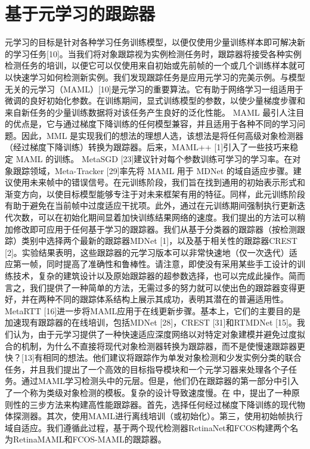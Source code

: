 \section{基于元学习的跟踪器} %
元学习的目标是针对各种学习任务训练模型，以便仅使用少量训练样本即可解决新的学习任务[10]。当我们将对象跟踪视为实例检测任务时，跟踪器将接受各种实例检测任务的培训，以便它可以仅使用来自初始或先前帧的一个或几个训练样本就可以快速学习如何检测新实例。我们发现跟踪任务是应用元学习的完美示例。与模型无关的元学习（MAML）[10]是元学习的重要算法。它有助于网络学习一组适用于微调的良好初始化参数。在训练期间，显式训练模型的参数，以使少量梯度步骤和来自新任务的少量训练数据将对该任务产生良好的泛化性能。 MAML 最引人注目的优点是，它与通过梯度下降训练的任何模型兼容，并且适用于各种不同的学习问题。因此，MML 是实现我们的想法的理想人选，该想法是将任何高级对象检测器（经过梯度下降训练）转换为跟踪器。后来，MAML++ [1]引入了一些技巧来稳定 MAML 的训练。 MetaSGD [23]建议针对每个参数训练可学习的学习率。在对象跟踪领域，Meta-Tracker [29]率先将 MAML 用于 MDNet 的域自适应步骤。建议使用未来帧中的错误信号。在元训练阶段，我们旨在找到通用的初始表示形式和渐变方向，以使目标模型能够专注于对未来框架有用的特征。同样，此元训练阶段有助于避免在当前帧中过度适应干扰项。此外，通过在元训练期间强制执行更新迭代次数，可以在初始化期间显着加快训练结果网络的速度。我们提出的方法可以稍加修改即可应用于任何基于学习的跟踪器。我们从基于分类器的跟踪器（按检测跟踪）类别中选择两个最新的跟踪器MDNet [1]，以及基于相关性的跟踪器CREST [2]。实验结果表明，这些跟踪器的元学习版本可以非常快速地（仅一次迭代）适应第一帧，同时提高了准确性和鲁棒性。请注意，即使没有采用某些手工设计的训练技术，复杂的建筑设计以及原始跟踪器的超参数选择，也可以完成此操作。简而言之，我们提供了一种简单的方法，无需过多的努力就可以使出色的跟踪器变得更好，并在两种不同的跟踪体系结构上展示其成功，表明其潜在的普遍适用性。 MetaRTT [16]进一步将MAML应用于在线更新步骤。基本上，它们的主要目的是加速现有跟踪器的在线培训，包括MDNet [28]，CREST [31]和RTMDNet [15]。我们认为，由于元学习提供了一种快速适应深度网络以对特定对象建模并避免过度拟合的机制，为什么不直接将现代对象检测器转换为跟踪器，而不是使慢速跟踪器更快？[13]有相同的想法。他们建议将跟踪作为单发对象检测和少发实例分类的联合任务，并且我们提出了一个高效的目标指导模块和一个元学习器来处理各个子任务。通过MAML学习检测头中的元层。但是，他们仍在跟踪器的第一部分中引入了一个称为类级对象检测的模板。复杂的设计导致速度慢。在 \cite{TrackingBy} 中，提出了一种原则性的三步方法来构建高性能跟踪器。首先，选择任何经过梯度下降训练的现代物体探测器。其次，使用MAML进行离线培训（或初始化）。第三，使用初始帧执行域自适应。我们遵循此过程，基于两个现代检测器RetinaNet和FCOS构建两个名为RetinaMAML和FCOS-MAML的跟踪器。
